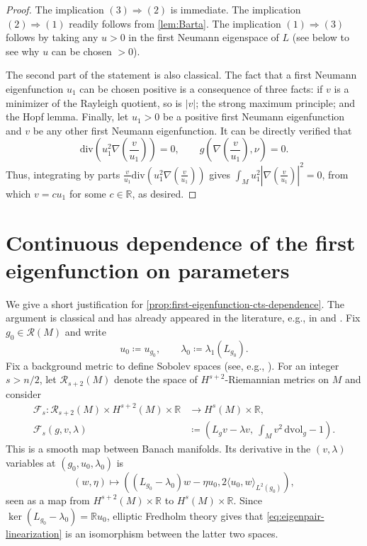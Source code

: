 \documentclass[11pt]{amsart}
\numberwithin{equation}{section}
\newcommand{\Riem}{\mathcal{R}}
\newcommand{\dvol}{\mathrm{dvol}}
\begin{document}
\begin{proof}
    The implication $(3)\Rightarrow (2)$ is immediate. The implication $(2)\Rightarrow (1)$ readily follows from \cref{lem:Barta}. The implication $(1)\Rightarrow (3)$ follows by taking any $u>0$ in the first Neumann eigenspace of $L$ (see below to see why $u$ can be chosen $>0$).
    
    The second part of the statement is also classical. The fact that a first Neumann eigenfunction $u_1$ can be chosen positive is a consequence of three facts: if $v$ is a minimizer of the Rayleigh quotient, so is $|v|$; the strong maximum principle; and the Hopf lemma. Finally, let $u_1>0$ be a positive first Neumann eigenfunction and $v$ be any other first Neumann eigenfunction. It can be directly verified that 
    \[
    \mathrm{div}\left(u_1^2\nabla\left(\frac{v}{u_1}\right)\right)=0, \qquad g\left(\nabla\left(\frac{v}{u_1}\right),\nu\right)=0.
    \]
    Thus, integrating by parts $\frac{v}{u_1}\mathrm{div}\left(u_1^2\nabla\left(\frac{v}{u_1}\right)\right)$ gives $\int_M u_1^2\left|\nabla\left(\frac{v}{u_1}\right)\right|^2=0$, from which $v=cu_1$ for some $c\in \mathbb R$, as desired.
\end{proof}

\section{Continuous dependence of the first eigenfunction on parameters}
\label{appendix:cont_dep}
    We give a short justification for \cref{prop:first-eigenfunction-cts-dependence}.
    The argument is classical and has already appeared in the literature, e.g., in \cite[p. 155]{DaiWangWei2005} and \cite[Remark 2.2 \& Footnote (10)]{LiMantoulidis2023}. 
Fix $g_0\in\Riem(M)$ and write
\[
 u_0\coloneqq u_{g_0},
 \qquad
 \lambda_0\coloneqq \lambda_1(L_{g_0}).
\]
Fix a background metric to define Sobolev spaces (see, e.g., \cite[Chapter 4]{TaylorPDEI}). For an integer $s>n/2$,
let $\Riem_{s+2}(M)$ denote the space of $H^{s+2}$-Riemannian metrics on $M$ and
consider
\begin{equation}\label{eq:eigenpair-IFT-map}
 \begin{split}
 \mathcal F_s:\Riem_{s+2}(M)\times H^{s+2}(M)\times\mathbb R
 &\longrightarrow H^s(M)\times\mathbb R,\\
 \mathcal F_s(g,v,\lambda)
 &\coloneqq \left(L_gv-\lambda v,\ \int_Mv^2\,\dvol_g-1\right).
 \end{split}
\end{equation}
This is a smooth map between Banach manifolds. Its derivative in the
$(v,\lambda)$ variables at $(g_0,u_0,\lambda_0)$ is
\begin{equation}\label{eq:eigenpair-linearization}
 (w,\eta)\longmapsto
 \left((L_{g_0}-\lambda_0)w-\eta u_0,
 2\langle u_0,w\rangle_{L^2(g_0)}\right),
\end{equation}
seen as a map from $H^{s+2}(M)\times \mathbb R$ to $H^{s}(M)\times \mathbb R$. 
Since $\ker(L_{g_0}-\lambda_0)=\mathbb Ru_0$, elliptic Fredholm theory gives that \eqref{eq:eigenpair-linearization} is an isomorphism between the latter two spaces.
\end{document}

